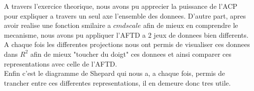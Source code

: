 \documentclass[a4paper,11pt]{article}
\begin{document}
\noindent A travers l'exercice theorique, nous avons pu apprecier la puissance de l'ACP pour expliquer a travers un seul axe l'ensemble des donnees. D'autre part, apres avoir realise une fonction smilaire a $cmdscale$ afin de mieux en comprendre le mecanisme, nous avons pu appliquer l'AFTD a 2 jeux de donnees bien differents. \\

\noindent A chaque fois les differentes projections nous ont permis de visualiser ces donnees dans $R^2$ afin de mieux "toucher du doigt" ces donnees et ainsi comparer ces representations avec celle de l'AFTD.\\
Enfin c'est le diagramme de Shepard qui nous a, a chaque fois, permis de trancher entre ces differentes representations, il en demeure donc tres utile.
\end{document}
